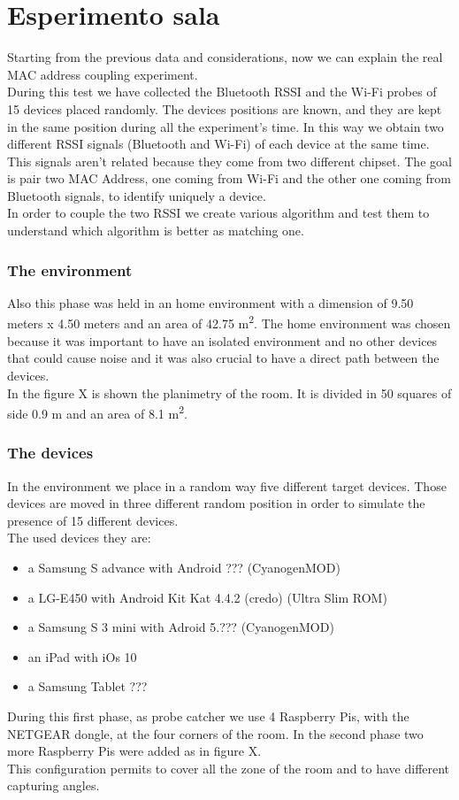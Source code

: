 \section{Esperimento sala}
Starting from the previous data and considerations, now we can explain the real MAC address coupling experiment.\\
During this test we have collected the Bluetooth RSSI and the Wi-Fi probes of 15 devices placed randomly. The devices positions are known, and they are kept in the same position during all the experiment's time. In this way we obtain two different RSSI signals (Bluetooth and Wi-Fi) of each device at the same time. This signals aren't related because they come from two different chipset. The goal is pair two MAC Address, one coming from Wi-Fi and the other one coming from Bluetooth signals, to identify uniquely a device.\\
In order to couple the two RSSI we create various algorithm and test them to understand which algorithm is better as matching one.

\subsubsection{The environment}
Also this phase was held in an home environment with a dimension of 9.50 meters x 4.50 meters and an area of 42.75 m\textsuperscript{2}.
The home environment was chosen because it was important to have an isolated environment and no other devices that could cause noise and it was also crucial to have a direct path between the devices.\\
In the figure X is shown the planimetry of the room. It is divided in 50 squares of side 0.9 m and an area of 8.1 m\textsuperscript{2}.
\subsubsection{The devices}
In the environment we place in a random way five different target devices. Those devices are moved in three different random position in order to simulate the presence of 15 different devices.\\
The used devices they are:
\begin{itemize}
\item a Samsung S advance with Android ??? (CyanogenMOD)
\item a LG-E450 with Android Kit Kat 4.4.2 (credo) (Ultra Slim ROM)
\item a Samsung S 3 mini with Adroid 5.??? (CyanogenMOD)
\item an iPad with iOs 10
\item a Samsung Tablet ???
\end{itemize}
During this first phase, as probe catcher we use 4 Raspberry Pis, with the NETGEAR dongle, at the four corners of the room. In the second phase two more Raspberry Pis were added as in figure X. \\
This configuration permits to cover all the zone of the room and to have different capturing angles.

